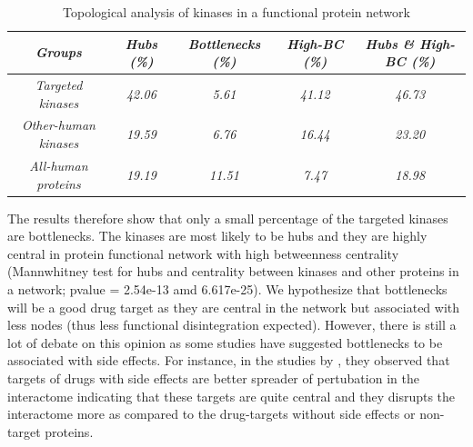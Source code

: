 \documentclass[a4paper, 11pt]{article}
\newcommand{\redcomment}[1]{\textcolor{red}{[#1]}} %
\begin{document}
\begin{table}[H]
\centering
\caption{Topological analysis of kinases in a functional protein network}
\label{hubs-bottlenecks}
\begin{tabular}{|c|c|c|c|c|}
\hline
\textit{Groups}             & \textit{Hubs (\%)} & \textit{Bottlenecks (\%)} & \textit{High-BC (\%)} & \textit{Hubs \& High-BC (\%)} \\ \hline
\textit{Targeted kinases}   & \textit{42.06}     & \textit{5.61}              & \textit{41.12}        & \textit{46.73}                \\ \hline
\textit{Other-human kinases}  & \textit{19.59}      & \textit{6.76}             & \textit{16.44}         & \textit{23.20}                  \\ \hline
\textit{All-human proteins} & \textit{19.19}     & \textit{11.51}            & \textit{7.47}         & \textit{18.98}                \\ \hline
\end{tabular}
\end{table}

The results therefore show that only a small percentage of the targeted kinases are bottlenecks. The kinases are most likely to be hubs and they are highly central in protein functional network with high betweenness centrality (Mannwhitney test for hubs and centrality between kinases and other proteins in a network; pvalue = 2.54e-13 amd 6.617e-25). We hypothesize that bottlenecks will be a good drug target as they are central in the network but associated with less nodes (thus less functional disintegration expected). However, there is still a lot of debate on this opinion as some studies have suggested bottlenecks to be associated with side effects.  For instance, in the studies by \cite{perez2015targets}, they observed that targets of drugs with side effects are better spreader of pertubation in the interactome indicating that these targets are quite central and they disrupts the interactome more as compared to the drug-targets without side effects or non-target proteins. %
\end{document}
